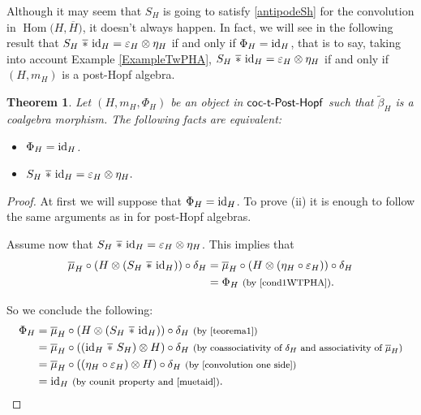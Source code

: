 \documentclass[10pt,a4paper]{amsart}
\numberwithin{equation}{section}
\newtheorem{Theorem}{Theorem}[section]
\DeclareMathOperator{\barast}{\,\overline{\ast}\,}
\DeclareMathOperator{\Hom}{Hom}
\begin{document}
Although it may seem that $S_{H}$ is going to satisfy \eqref{antipodeSh} for the convolution in $\Hom\bigl(H,\overline{H}\bigr)$, it doesn't always happen. In fact, we will see in the following result that $S_{H}\barast {\rm id}_{H}=\varepsilon_{H}\otimes\eta_{H}$ if and only if $\Phi_{H}={\rm id}_{H}$, that is to say, taking into account Example \ref{ExampleTwPHA}, $S_{H}\barast {\rm id}_{H}=\varepsilon_{H}\otimes\eta_{H}$ if and only if $(H,m_{H})$ is a post-Hopf algebra.
\begin{Theorem}\label{iffPhi=id}
Let $(H,m_{H},\Phi_{H})$ be an object in $\sf{coc}\textnormal{-}\sf{t}\textnormal{-}\sf{Post}\textnormal{-}\sf{Hopf}$ such that $\tilde{\beta}_{H}$ is a coalgebra morphism.
The following facts are equivalent:
\begin{itemize}\itemsep=0pt
\item[$(i)$]$\Phi_{H}={\rm id}_{H}$.
\item[$(ii)$] $S_{H}\barast {\rm id}_{H}=\varepsilon_{H}\otimes\eta_{H}.$
\end{itemize}
\end{Theorem}
\begin{proof}
At first we will suppose that $\Phi_{H}={\rm id}_{H}$. To prove (ii) it is enough to follow the same arguments as in \cite[Lemma 3.13]{FGR} for post-Hopf algebras.

Assume now that $S_{H}\barast {\rm id}_{H}=\varepsilon_{H}\otimes\eta_{H}$. This implies that
\begin{align}
\overline{\mu}_{H}\circ(H\otimes (S_{H}\barast {\rm id}_{H}))\circ\delta_{H}
={}&\overline{\mu}_{H}\circ(H\otimes (\eta_{H}\circ\varepsilon_{H}))\circ\delta_{H}\nonumber\\
={}&\Phi_{H}\ \text{\footnotesize\textnormal{(by \eqref{cond1WTPHA})}}.\label{teorema1}
\end{align}

So we conclude the following:
\begin{align*}
\Phi_{H}={}&\overline{\mu}_{H}\circ(H\otimes (S_{H}\barast {\rm id}_{H}))\circ\delta_{H}\ \text{\footnotesize\textnormal{(by \eqref{teorema1})}}\\
={}&\overline{\mu}_{H}\circ(({\rm id}_{H}\barast S_{H})\otimes H)\circ\delta_{H}\ \text{\footnotesize\textnormal{(by coassociativity of $\delta_{H}$ and associativity of $\overline{\mu}_{H}$)}}\\
={}&\overline{\mu}_{H}\circ((\eta_{H}\circ\varepsilon_{H})\otimes H)\circ\delta_{H}\ \text{\footnotesize\textnormal{(by \eqref{convolution one side})}}\\
={}&{\rm id}_{H}\ \text{\footnotesize\textnormal{(by counit property and \eqref{muetaid})}}.\tag*{\qed}
\end{align*}
\renewcommand{\qed}{}
\end{proof}
\end{document}
